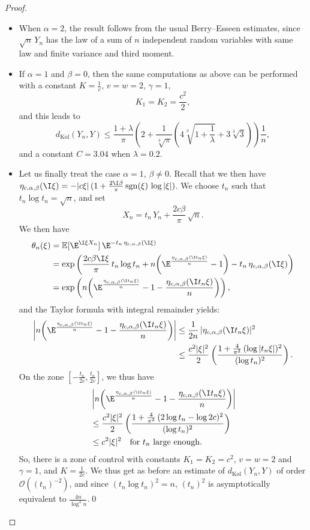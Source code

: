 \documentclass[envcountsame]{svmult}
\def\O{\mathcal{O}}
\newcommand{\esper}{\mathbb{E}}
\newcommand{\dkol}{d_\mathrm{Kol}}
\begin{document}
\begin{proof}
\begin{itemize}
\item When $\alpha=2$, the result follows from the usual Berry--Esseen estimates, since $\sqrt{n}\,Y_n$ has the law of a sum of $n$ independent random variables with same law and finite variance and third moment.

\item If $\alpha=1$ and $\beta=0$, then the same computations as above can be performed with a constant $K= \frac{1}{c}$, $v=w=2$, $\gamma=1$,
$$K_1=K_2=\frac{c^2}{2},$$
and this leads to
$$\dkol(Y_n,Y) \leq \frac{1+\lambda}{\pi}\left(2+\frac{1}{\sqrt[3]{\pi}}\left(4\sqrt[3]{1+\frac{1}{\lambda}}+3\sqrt[3]{3}\right)\right)\frac{1}{n},$$
and a constant $C=3.04$ when $\lambda=0.2$. 

\item Let us finally treat the case $\alpha=1$, $\beta \neq 0$. Recall that we then have $\eta_{c,\alpha,\beta}(\I \xi) = -|c\xi|\,(1+\frac{2\I \beta}{\pi}\,\mathrm{sgn}(\xi)\,\log|\xi|)$. We choose $t_n$ such that $t_n \log t_n = \sqrt{n}$, and set 
$$X_n = t_n\,Y_n + \frac{2c\beta}{\pi}\,\sqrt{n}.$$
We then have 
\begin{align*}
\theta_n(\xi) &= \esper[\E^{\I\xi X_n}]\,\E^{-t_n\,\eta_{c,\alpha,\beta}(\I \xi)} \\
&= \exp\left(\frac{2c\beta \I \xi}{\pi} \,t_n \log t_n + n \!\left(\E^{\frac{\eta_{c,\alpha,\beta}(\I t_n  \xi)}{n}}-1\right) -t_n\,\eta_{c,\alpha,\beta}(\I \xi)\right) \\
&= \exp\left(n \!\left(\E^{\frac{\eta_{c,\alpha,\beta}(\I t_n  \xi)}{n}} -1 - \frac{\eta_{c,\alpha,\beta}(\I t_n  \xi)}{n}\right) \right),
\end{align*}
and the Taylor formula with integral remainder yields:
\begin{align*}
\left|n \!\left(\E^{\frac{\eta_{c,\alpha,\beta}(\I t_n  \xi)}{n}} -1 - \frac{\eta_{c,\alpha,\beta}(\I t_n  \xi)}{n}\right)\right| &\leq \frac{1}{2n}\,|\eta_{c,\alpha,\beta}(\I t_n  \xi)|^2 \\
&\leq \frac{c^2|\xi|^2}{2}\left(\frac{1+ \frac{4}{\pi^2}\,(\log |t_n\xi|)^2}{(\log t_n)^2}\right).
\end{align*}
On the zone $[-\frac{t_n}{2c} , \frac{t_n}{2c}]$, we thus have 
\begin{align*}
  &\left|n \!\left(\E^{\frac{\eta_{c,\alpha,\beta}(\I t_n  \xi)}{n}} -1 - \frac{\eta_{c,\alpha,\beta}(\I t_n  \xi)}{n}\right)\right| \\
  &\leq \frac{c^2|\xi|^2}{2}\left(\frac{1+ \frac{4}{\pi^2}\,(2 \log t_n -\log 2c)^2}{(\log t_n)^2}\right) \\
  &\leq c^2|\xi|^2\quad \text{for $t_n$ large enough.}
 \end{align*}
 So, there is a zone of control with constants $K_1=K_2 = c^2$, $v=w=2$ and $\gamma=1$, and $K= \frac{1}{2c}$. We thus get as before an estimate of $\dkol(Y_n,Y)$ of order $\O((t_n)^{-2})$, and since $(t_n \log t_n)^2 = n$, $(t_n)^2$ is asymptotically equivalent to $\frac{4n}{\log^2 n}$.\qed
\end{itemize}
\end{proof}
\end{document}
